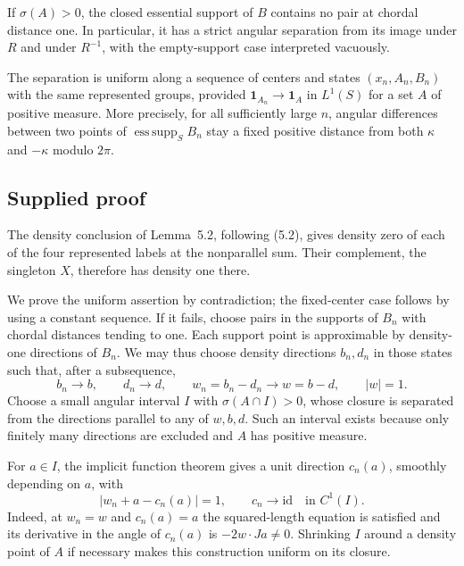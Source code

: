 \documentclass[11pt]{article}
\theoremstyle{definition}
\theoremstyle{remark}
\begin{document}
If $\sigma(A)>0$, the closed essential support of $B$ contains no pair at chordal
distance one. In particular, it has a strict angular separation from its image
under $R$ and under $R^{-1}$, with the empty-support case interpreted vacuously.

The separation is uniform along a sequence of centers and states
$(x_n,A_n,B_n)$ with the same represented groups, provided
$\mathbf{1}_{A_n}\to\mathbf{1}_A$ in $L^1(S)$ for a set $A$ of positive measure.
More precisely, for all sufficiently large $n$, angular differences between two
points of $\operatorname{ess\,supp}_S B_n$ stay a fixed positive distance from both
$\kappa$ and $-\kappa$ modulo $2\pi$.

\subsection*{Supplied proof}
The density conclusion of Lemma~5.2, following (5.2), gives density zero of each
of the four represented labels at the nonparallel sum. Their complement, the
singleton $X$, therefore has density one there.

We prove the uniform assertion by contradiction; the fixed-center case follows
by using a constant sequence. If it fails, choose pairs in the supports of
$B_n$ with chordal distances tending to one. Each support point is approximable
by density-one directions of $B_n$. We may thus choose density directions
$b_n,d_n$ in those states such that, after a subsequence,
\[
b_n\longrightarrow b,\qquad d_n\longrightarrow d,\qquad
w_n=b_n-d_n\longrightarrow w=b-d,\qquad |w|=1.
\]
Choose a small angular interval $I$ with $\sigma(A\cap I)>0$, whose closure is
separated from the directions parallel to any of $w,b,d$. Such an interval
exists because only finitely many directions are excluded and $A$ has positive
measure.

For $a\in I$, the implicit function theorem gives a unit direction $c_n(a)$,
smoothly depending on $a$, with
\[
|w_n+a-c_n(a)|=1,\qquad c_n\longrightarrow\mathrm{id}\quad\text{in }C^1(I).
\]
Indeed, at $w_n=w$ and $c_n(a)=a$ the squared-length equation is satisfied and
its derivative in the angle of $c_n(a)$ is $-2w\cdot Ja\ne0$. Shrinking $I$
around a density point of $A$ if necessary makes this construction uniform on
its closure.
\end{document}
